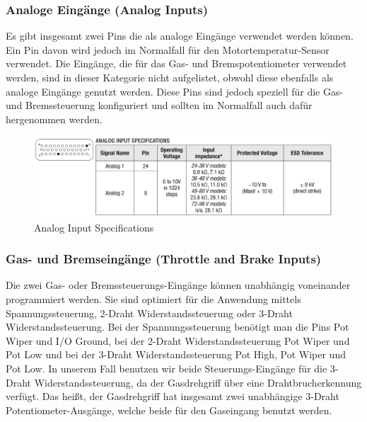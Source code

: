 \subsubsection{Analoge Eingänge (Analog Inputs)}
Es gibt insgesamt zwei Pins die als analoge Eingänge verwendet werden können. Ein Pin davon wird jedoch im Normalfall für den Motortemperatur-Sensor verwendet. Die Eingänge, die für das Gas- und Bremspotentiometer verwendet werden, sind in dieser Kategorie nicht aufgelistet, obwohl diese ebenfalls als analoge Eingänge genutzt werden. Diese Pins sind jedoch speziell für die Gas- und Bremssteuerung konfiguriert und sollten im Normalfall auch dafür hergenommen werden.

\begin{figure}[H]
	\begin{center}
		\includegraphics[width=\textwidth]{figures/antrieb/Analog_Input_Specifications.png}
		\caption{Analog Input Specifications}
	\end{center}
\end{figure}



\newpage



\subsubsection{Gas- und Bremseingänge (Throttle and Brake Inputs)}
Die zwei Gas- oder Bremssteuerungs-Eingänge können unabhängig voneinander programmiert werden. Sie sind optimiert für die Anwendung mittels Spannungssteuerung, 2-Draht Widerstandssteuerung oder 3-Draht Widerstandssteuerung. Bei der Spannungssteuerung benötigt man die Pins Pot Wiper und I/O Ground, bei der 2-Draht Widerstandssteuerung Pot Wiper und Pot Low und bei der 3-Draht Widerstandssteuerung Pot High, Pot Wiper und Pot Low. In unserem Fall benutzen wir beide Steuerungs-Eingänge für die 3-Draht Widerstandssteuerung, da der Gasdrehgriff über eine Drahtbrucherkennung verfügt. Das heißt, der Gasdrehgriff hat insgesamt zwei unabhängige 3-Draht Potentiometer-Ausgänge, welche beide für den Gaseingang benutzt werden.

